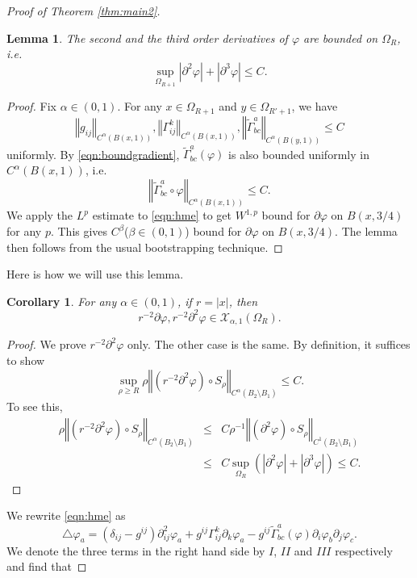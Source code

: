 \documentclass{amsart}
\newtheorem{cor}[thm]{Corollary}
\newtheorem{lem}[thm]{Lemma}
\newcommand{\norm}[1]{\left\Vert#1\right\Vert}
\newcommand{\abs}[1]{\left\vert#1\right\vert}
\numberwithin{equation}{section}
\begin{document}
\begin{proof}[Proof of Theorem \ref{thm:main2}]
	\begin{lem}
		\label{lem:local} The second and the third order derivatives of $\varphi$ are bounded on $\Omega_R$, i.e.
		\[
			\sup_{\Omega_{R+1}} \abs{\partial^2 \varphi}+ \abs{\partial^3 \varphi}\leq C.
		\]
	\end{lem}
	\begin{proof}
		Fix $\alpha\in (0,1)$. For any $x\in \Omega_{R+1}$ and $y\in \Omega_{R'+1}$, we have 
		\[
			\norm{g_{ij}}_{C^\alpha(B(x,1))}, \norm{\Gamma^k_{ij}}_{C^\alpha(B(x,1))}, \norm{\tilde \Gamma^a_{bc}}_{C^\alpha(B(y,1))}\leq C
		\]
		uniformly.
		By \eqref{eqn:boundgradient}, $\tilde{\Gamma}^a_{bc}(\varphi)$ is also bounded uniformly in $C^\alpha(B(x,1))$, i.e.
		\[
			\norm{\tilde \Gamma^a_{bc}\circ \varphi}_{C^\alpha(B(x,1))}\leq C.
		\]
		We apply the $L^p$ estimate to \eqref{eqn:hme} to get $W^{1,p}$ bound for $\partial \varphi$ on $B(x,3/4)$ for any $p$. This gives $C^\beta$($\beta\in (0,1)$) bound for $\partial \varphi$ on $B(x,3/4)$. The lemma then follows from the usual bootstrapping technique.
	\end{proof}
	Here is how we will use this lemma.
	\begin{cor}
		\label{cor:use} For any $\alpha\in (0,1)$, if $r=\abs{x}$, then
		\[
			r^{-2} \partial \varphi, r^{-2} \partial^2 \varphi \in \mathcal X_{\alpha,1}(\Omega_R).
		\]
	\end{cor}
	\begin{proof}
		We prove $r^{-2} \partial^2 \varphi$ only. The other case is the same. By definition, it suffices to show
		\[
			\sup_{\rho\geq R} \rho \norm{ (r^{-2} \partial^2 \varphi)\circ S_\rho}_{C^\alpha(B_2\setminus B_1)}\leq C.
		\]
		To see this,
		\begin{eqnarray*}
			\rho \norm{ (r^{-2} \partial^2 \varphi)\circ S_\rho}_{C^\alpha(B_2\setminus B_1)} &\leq& C \rho^{-1} \norm{(\partial^2 \varphi)\circ S_\rho}_{C^1(B_2\setminus B_1)} \\
													  &\leq& C \sup_{\Omega_{R}} (\abs{\partial^2 \varphi}+ \abs{\partial^3 \varphi}) \leq C.
		\end{eqnarray*}
	\end{proof}
	We rewrite \eqref{eqn:hme} as
	\begin{equation}
		\label{eqn:newhme}
		\triangle \varphi_a = (\delta_{ij}-g^{ij}) \partial^2_{ij} \varphi_a + g^{ij}\Gamma^k_{ij} \partial_k \varphi_a - g^{ij} \tilde{\Gamma}^a_{bc}(\varphi) \partial_i \varphi_b \partial_j \varphi_c.
	\end{equation}
	We denote the three terms in the right hand side by $I$, $II$ and $III$ respectively and find that

\end{proof}
\end{document}
